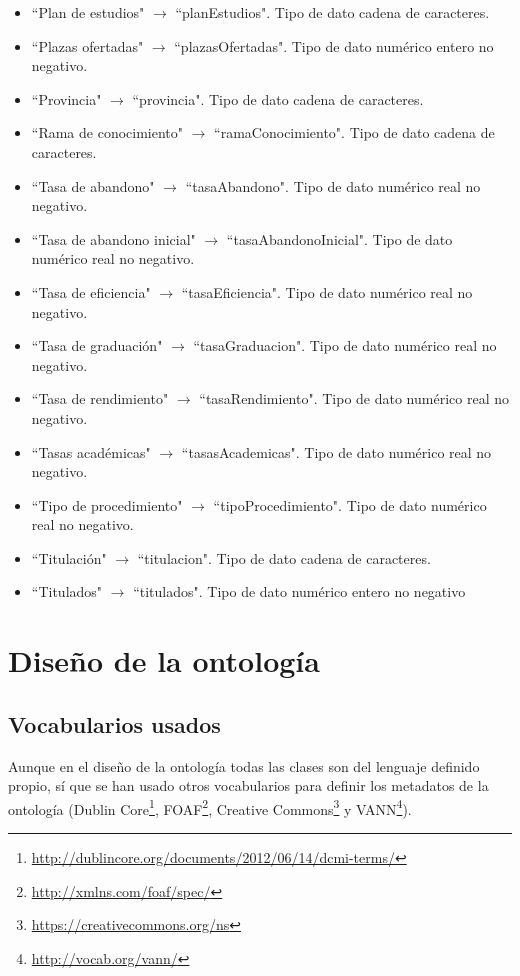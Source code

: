 \begin{itemize}
	\item ``Plan de estudios" $\rightarrow$ ``planEstudios". Tipo de dato cadena de caracteres.
	\item ``Plazas ofertadas" $\rightarrow$ ``plazasOfertadas". Tipo de dato numérico entero no negativo.
	\item ``Provincia" $\rightarrow$ ``provincia". Tipo de dato cadena de caracteres.
	\item ``Rama de conocimiento" $\rightarrow$ ``ramaConocimiento". Tipo de dato cadena de caracteres.
	\item ``Tasa de abandono" $\rightarrow$ ``tasaAbandono". Tipo de dato numérico real no negativo.
	\item ``Tasa de abandono inicial" $\rightarrow$ ``tasaAbandonoInicial". Tipo de dato numérico real no negativo.
	\item ``Tasa de eficiencia" $\rightarrow$ ``tasaEficiencia". Tipo de dato numérico real no negativo.
	\item ``Tasa de graduación" $\rightarrow$ ``tasaGraduacion". Tipo de dato numérico real no negativo.
	\item ``Tasa de rendimiento" $\rightarrow$ ``tasaRendimiento". Tipo de dato numérico real no negativo.
	\item ``Tasas académicas" $\rightarrow$ ``tasasAcademicas". Tipo de dato numérico real no negativo.
	\item ``Tipo de procedimiento" $\rightarrow$ ``tipoProcedimiento". Tipo de dato numérico real no negativo.
	\item ``Titulación" $\rightarrow$ ``titulacion". Tipo de dato cadena de caracteres.
	\item ``Titulados" $\rightarrow$ ``titulados". Tipo de dato numérico entero no negativo
\end{itemize}


\newpage

\section{Diseño de la ontología}

\subsection{Vocabularios usados}

Aunque en el diseño de la ontología todas las clases son del lenguaje definido propio, sí que se han usado otros vocabularios para definir los metadatos de la ontología (Dublin Core\footnote{\url{http://dublincore.org/documents/2012/06/14/dcmi-terms/}}, FOAF\footnote{\url{http://xmlns.com/foaf/spec/}}, Creative Commons\footnote{\url{https://creativecommons.org/ns}} y VANN\footnote{\url{http://vocab.org/vann/}}). \bigskip

